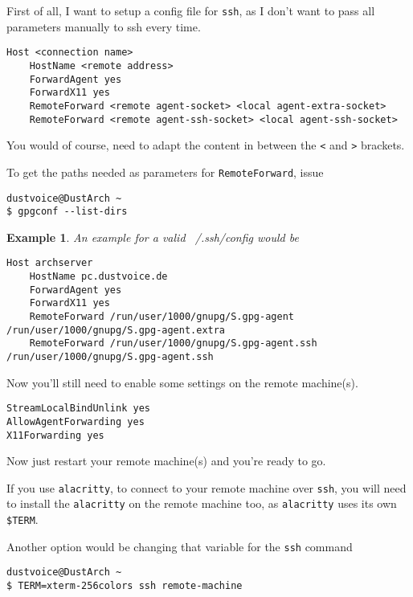 \documentclass[9pt]{report}
\newtheorem{example}{Example}
\newenvironment{NOTE}
{\begin{tcolorbox}[colback=admonitionBG,coltitle=draculaFG,colframe=draculaBlue,colbacktitle=draculaBlue,title=NOTE]}
{\end{tcolorbox}}
\begin{document}
First of all, I want to setup a config file for \texttt{ssh}, as I don’t want to pass all parameters manually to ssh every time.


\begin{verbatim}
Host <connection name>
    HostName <remote address>
    ForwardAgent yes
    ForwardX11 yes
    RemoteForward <remote agent-socket> <local agent-extra-socket>
    RemoteForward <remote agent-ssh-socket> <local agent-ssh-socket>
\end{verbatim}

\begin{NOTE}
    You would of course, need to adapt the content in between the \texttt{<} and \texttt{>} brackets.


    To get the paths needed as parameters for \texttt{RemoteForward}, issue


    \begin{verbatim}
dustvoice@DustArch ~
$ gpgconf --list-dirs
    \end{verbatim}
\end{NOTE}

\begin{example}
    An example for a valid \textit{~/.ssh/config} would be


    \begin{verbatim}
Host archserver
    HostName pc.dustvoice.de
    ForwardAgent yes
    ForwardX11 yes
    RemoteForward /run/user/1000/gnupg/S.gpg-agent /run/user/1000/gnupg/S.gpg-agent.extra
    RemoteForward /run/user/1000/gnupg/S.gpg-agent.ssh /run/user/1000/gnupg/S.gpg-agent.ssh
    \end{verbatim}
\end{example}

Now you’ll still need to enable some settings on the remote machine(s).


\begin{verbatim}
StreamLocalBindUnlink yes
AllowAgentForwarding yes
X11Forwarding yes
\end{verbatim}

Now just restart your remote machine(s) and you’re ready to go.


\begin{NOTE}
    If you use \texttt{alacritty}, to connect to your remote machine over \texttt{ssh}, you will need to install the \texttt{alacritty} on the remote machine too, as \texttt{alacritty} uses its own \texttt{\$TERM}.


    Another option would be changing that variable for the \texttt{ssh} command


    \begin{verbatim}
dustvoice@DustArch ~
$ TERM=xterm-256colors ssh remote-machine
    \end{verbatim}
\end{NOTE}
\end{document}
